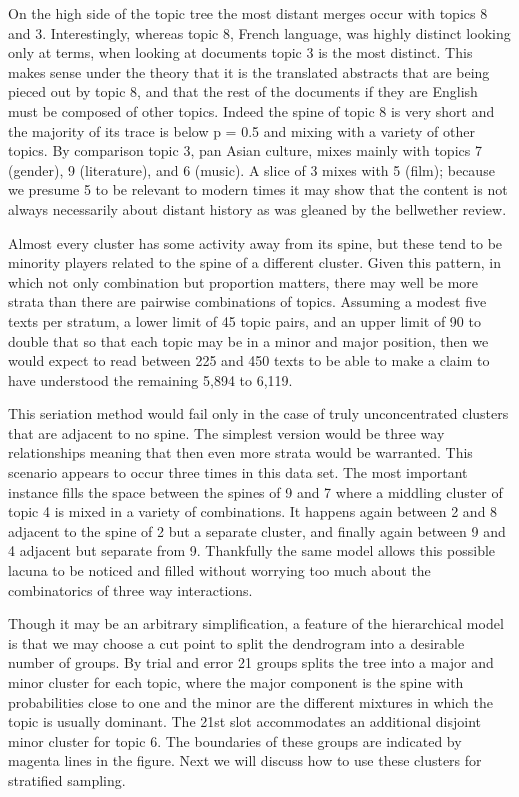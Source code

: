 \documentclass[]{book}
\theoremstyle{definition}
\theoremstyle{definition}
\theoremstyle{definition}
\theoremstyle{remark}
\begin{document}
On the high side of the topic tree the most distant merges occur with
topics 8 and 3. Interestingly, whereas topic 8, French language, was
highly distinct looking only at terms, when looking at documents topic 3
is the most distinct. This makes sense under the theory that it is the
translated abstracts that are being pieced out by topic 8, and that the
rest of the documents if they are English must be composed of other
topics. Indeed the spine of topic 8 is very short and the majority of
its trace is below p = 0.5 and mixing with a variety of other topics. By
comparison topic 3, pan Asian culture, mixes mainly with topics 7
(gender), 9 (literature), and 6 (music). A slice of 3 mixes with 5
(film); because we presume 5 to be relevant to modern times it may show
that the content is not always necessarily about distant history as was
gleaned by the bellwether review.

Almost every cluster has some activity away from its spine, but these
tend to be minority players related to the spine of a different cluster.
Given this pattern, in which not only combination but proportion
matters, there may well be more strata than there are pairwise
combinations of topics. Assuming a modest five texts per stratum, a
lower limit of 45 topic pairs, and an upper limit of 90 to double that
so that each topic may be in a minor and major position, then we would
expect to read between 225 and 450 texts to be able to make a claim to
have understood the remaining 5,894 to 6,119.

This seriation method would fail only in the case of truly
unconcentrated clusters that are adjacent to no spine. The simplest
version would be three way relationships meaning that then even more
strata would be warranted. This scenario appears to occur three times in
this data set. The most important instance fills the space between the
spines of 9 and 7 where a middling cluster of topic 4 is mixed in a
variety of combinations. It happens again between 2 and 8 adjacent to
the spine of 2 but a separate cluster, and finally again between 9 and 4
adjacent but separate from 9. Thankfully the same model allows this
possible lacuna to be noticed and filled without worrying too much about
the combinatorics of three way interactions.

Though it may be an arbitrary simplification, a feature of the
hierarchical model is that we may choose a cut point to split the
dendrogram into a desirable number of groups. By trial and error 21
groups splits the tree into a major and minor cluster for each topic,
where the major component is the spine with probabilities close to one
and the minor are the different mixtures in which the topic is usually
dominant. The 21st slot accommodates an additional disjoint minor
cluster for topic 6. The boundaries of these groups are indicated by
magenta lines in the figure. Next we will discuss how to use these
clusters for stratified sampling.
\end{document}

